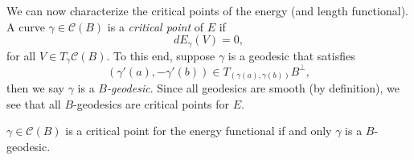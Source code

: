We can now characterize the critical points of the energy (and length functional).  A curve $\gamma\in\mathcal{C}(B)$ is a \textit{critical point} of $E$ if
$$dE_{\gamma}(V)=0,$$
for all $V\in T_\gamma\mathcal{C}(B)$.  To this end, suppose $\gamma$ is a geodesic that satisfies
$$(\gamma'(a),-\gamma'(b))\in T_{(\gamma(a),\gamma(b))}B^\perp,$$
then we say $\gamma$ is a \textit{$B$-geodesic}.  Since all geodesics are smooth (by definition), we see that all $B$-geodesics are critical points for $E$.

\begin{cor}
    $\gamma\in\mathcal{C}(B)$ is a critical point for the energy functional if and only $\gamma$ is a $B$-geodesic.
\end{cor}

